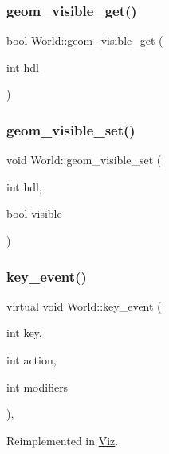 \subsubsection{\texorpdfstring{geom\+\_\+visible\+\_\+get()}{geom\_visible\_get()}}
{\footnotesize\ttfamily bool World\+::geom\+\_\+visible\+\_\+get (\begin{DoxyParamCaption}\item[{int}]{hdl }\end{DoxyParamCaption})}

\mbox{\label{classWorld_ac59b8559fb117042c25a2f5da0547e33}} 
\subsubsection{\texorpdfstring{geom\+\_\+visible\+\_\+set()}{geom\_visible\_set()}}
{\footnotesize\ttfamily void World\+::geom\+\_\+visible\+\_\+set (\begin{DoxyParamCaption}\item[{int}]{hdl,  }\item[{bool}]{visible }\end{DoxyParamCaption})}

\mbox{\label{classWorld_a46ecee55e2359c32f14c0d8d084dad73}} 
\subsubsection{\texorpdfstring{key\+\_\+event()}{key\_event()}}
{\footnotesize\ttfamily virtual void World\+::key\+\_\+event (\begin{DoxyParamCaption}\item[{int}]{key,  }\item[{int}]{action,  }\item[{int}]{modifiers }\end{DoxyParamCaption})\hspace{0.3cm}{\ttfamily [protected]}, {\ttfamily [virtual]}}



Reimplemented in \mbox{\hyperlink{classViz_ae77de461c1252a35cff01651295eddf5}{Viz}}.

\mbox{\label{classWorld_ae9da24cdb1ba2803d48cf8d46c851c4b}} 
